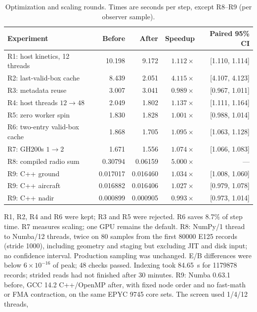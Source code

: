\documentclass[11pt]{article}
\renewcommand{\arraystretch}{1.18}
\begin{document}
\begin{table}[H]
\centering
\caption{Optimization and scaling rounds. Times are seconds per step, except R8--R9 (per observer sample).}
\begingroup
\renewcommand{\arraystretch}{1.35}
\begin{tabular*}{\linewidth}{@{\extracolsep{\fill}}lrrrr@{}}
\toprule
Experiment & Before & After & Speedup & Paired 95\% CI \\
\midrule
R1: host kinetics, 12 threads & 10.198 & 9.172 & $1.112\times$ & [1.110, 1.114] \\
R2: last-valid-box cache & 8.439 & 2.051 & $4.115\times$ & [4.107, 4.123] \\
R3: metadata reuse & 3.007 & 3.041 & $0.989\times$ & [0.967, 1.011] \\
R4: host threads $12\to48$ & 2.049 & 1.802 & $1.137\times$ & [1.111, 1.164] \\
R5: zero worker spin & 1.830 & 1.828 & $1.001\times$ & [0.988, 1.014] \\
R6: two-entry valid-box cache & 1.868 & 1.705 & $1.095\times$ & [1.063, 1.128] \\
R7: GH200s $1\to2$ & 1.671 & 1.556 & $1.074\times$ & [1.066, 1.083] \\
R8: compiled radio sum & 0.30794 & 0.06159 & $5.000\times$ & --- \\
R9: C++ ground & 0.017017 & 0.016460 & $1.034\times$ & [1.008, 1.060] \\
R9: C++ aircraft & 0.016882 & 0.016406 & $1.027\times$ & [0.979, 1.078] \\
R9: C++ nadir & 0.000899 & 0.000905 & $0.993\times$ & [0.973, 1.014] \\
\bottomrule
\end{tabular*}
\endgroup
\par\medskip
\begin{minipage}{\linewidth}\small
R1, R2, R4 and R6 were kept; R3 and R5 were rejected.
R6 saves 8.7\% of step time. R7 measures scaling; one GPU remains the default.
R8: NumPy/1 thread to Numba/12 threads, twice on 80 samples from the first
80000 E125 records (stride 1000), including geometry and staging but excluding
JIT and disk input; no confidence interval. Production sampling was unchanged.
E/B differences were below $6\times10^{-16}$ of peak; 48 checks passed. Indexing took
84.65~s for 1179878 records; strided reads had not finished after 30 minutes.
R9: Numba 0.63.1 before, GCC 14.2 C++/OpenMP after, with fixed node order and
no fast-math or FMA contraction, on the same EPYC 9745 core sets. The screen used 1/4/12 threads,

\end{minipage}
\end{table}
\end{document}
